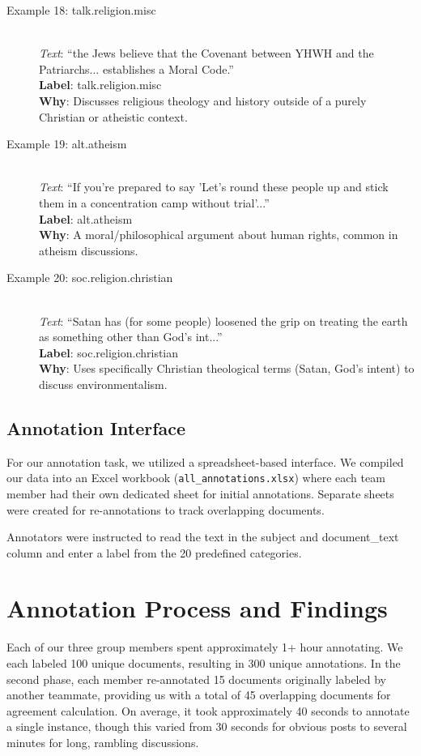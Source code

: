 \documentclass{article}
\begin{document}
\begin{description}
    \item[Example 18: talk.religion.misc] \hfill \\
    \textit{Text}: ``the Jews believe that the Covenant between YHWH and the Patriarchs... establishes a Moral Code.'' \\
    \textbf{Label}: talk.religion.misc \\
    \textbf{Why}: Discusses religious theology and history outside of a purely Christian or atheistic context.

    \item[Example 19: alt.atheism] \hfill \\
    \textit{Text}: ``If you're prepared to say 'Let's round these people up and stick them in a concentration camp without trial'...'' \\
    \textbf{Label}: alt.atheism \\
    \textbf{Why}: A moral/philosophical argument about human rights, common in atheism discussions.

    \item[Example 20: soc.religion.christian] \hfill \\
    \textit{Text}: ``Satan has (for some people) loosened the grip on treating the earth as something other than God's int...'' \\
    \textbf{Label}: soc.religion.christian \\
    \textbf{Why}: Uses specifically Christian theological terms (Satan, God's intent) to discuss environmentalism.
\end{description}

\subsection{Annotation Interface}
For our annotation task, we utilized a spreadsheet-based interface. We compiled our data into an Excel workbook (\texttt{all\_annotations.xlsx}) where each team member had their own dedicated sheet for initial annotations. Separate sheets were created for re-annotations to track overlapping documents. 

Annotators were instructed to read the text in the subject and document\_text column and enter a label from the 20 predefined categories.

\section{Annotation Process and Findings}
Each of our three group members spent approximately 1+ hour annotating. We each labeled 100 unique documents, resulting in 300 unique annotations. In the second phase, each member re-annotated 15 documents originally labeled by another teammate, providing us with a total of 45 overlapping documents for agreement calculation. On average, it took approximately 40 seconds to annotate a single instance, though this varied from 30 seconds for obvious posts to several minutes for long, rambling discussions.
\end{document}

